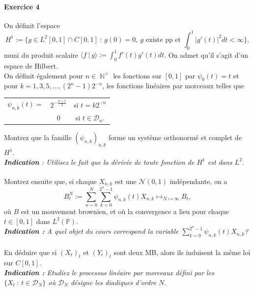\documentclass{article}
\theoremstyle{definition}
\numberwithin{equation}{section}
\DeclareMathOperator{\N}{\mathbb{N}}
\begin{document}
\paragraph{Exercice 4}
On définit l'espace 
$$H^1:=\{g\in L^2[0,1]\cap C[0,1]~:~g(0)=0,~g\text{ existe pp et } \int_0^1 |g'(t)|^2dt<\infty\},$$
muni du produit scalaire $\langle f~|~g\rangle := \int_0^1 f'(t)g'(t)dt$. On admet qu'il s'agit d'un espace de Hilbert.\\
On définit également pour $n\in\N^\times$ les fonctions sur $[0,1]$ par $\psi_0(t)=t$ et pour $k=1,3,5,\dots,(2^n-1)2^{-n}$, les fonctions linéaires par morceaux telles que\\
\begin{center}
\begin{tabular}{c|cc}
    $\psi_{n,k}(t) =$ & $2^{-\frac{n+1}{2}}$ & si $t=k2^{-n}$\\
    & $0$  & si $t\in \mathcal{D}_n$.\\
\end{tabular}
\end{center}
Montrez que la famille $(\psi_{n,k})_{n,k}$ forme un système orthonormé et complet de $H^1$.\\
\textit{\textbf{Indication} : Utilisez le fait que la dérivée de toute fonction de $H^1$ est dans $L^2$.}\\
~\\
Montrez ensuite que, si chaque $X_{n,k}$ est une $\mathcal{N}(0,1)$ indépendante, on a
$$ B_t^N := \sum_{n=0}^N \sum_{k=0}^{2^n-1} \psi_{n,k}(t)X_{n,k} \longmapsto_{N\mapsto \infty} B_t, $$
où $B$ est un mouvement brownien, et où la convergence a lieu pour chaque $t\in[0,1]$ dans $L^2(\mathbb{P})$.\\
\textit{\textbf{Indication :} A quel objet du cours correspond la variable $\sum_{k=0}^{2^n-1} \psi_{n,k}(t)X_{n,k}$?}\\
~\\
En déduire que si $(X_t)_t$ et $(Y_t)_t$ sont deux MB, alors ils induisent la même loi sur $C[0,1]$.\\
\textit{\textbf{Indication :} Etudiez le processus linéaire par morceaux défini par les $\{X_t~:~t\in \mathcal{D}_N\}$ où $\mathcal{D}_N$ désigne les diadiques d'ordre $N$.}
\end{document}
